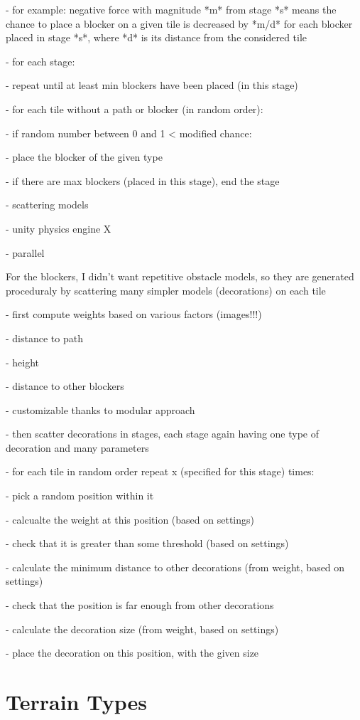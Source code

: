 - for example: negative force with magnitude *m* from stage *s* means the chance to place a blocker on a given tile is decreased by *m/d*  for each blocker placed in stage *s*, where *d* is its distance from the considered tile

- for each stage:

- repeat until at least min blockers have been placed (in this stage)

- for each tile without a path or blocker (in random order):

- if random number between 0 and 1 < modified chance:

- place the blocker of the given type

- if there are max blockers (placed in this stage), end the stage

- scattering models

- unity physics engine X

- parallel

For the blockers, I didn't want repetitive obstacle models, so they are generated proceduraly by scattering many simpler models (decorations) on each tile

- first compute weights based on various factors (images!!!)

- distance to path

- height

- distance to other blockers

- customizable thanks to modular approach

- then scatter decorations in stages, each stage again having one type of decoration and many parameters

- for each tile in random order repeat x (specified for this stage) times:

- pick a random position within it

- calcualte the weight at this position (based on settings)

- check that it is greater than some threshold (based on settings)

- calculate the minimum distance to other decorations (from weight, based on settings)

- check that the position is far enough from other decorations

- calculate the decoration size (from weight, based on settings)

- place the decoration on this position, with the given size

\section{Terrain Types}

